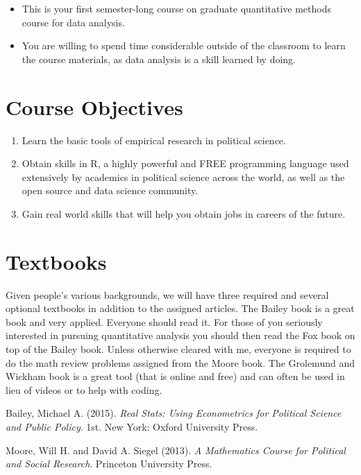 \documentclass[11pt,]{article}
\begin{document}
\begin{itemize}
\item
  This is your first semester-long course on graduate quantitative
  methods course for data analysis.
\item
  You are willing to spend time considerable outside of the classroom to
  learn the course materials, as data analysis is a skill learned by
  doing.
\end{itemize}

\section{Course Objectives}\label{course-objectives}

\begin{enumerate}
\def\labelenumi{\arabic{enumi}.}
\item
  Learn the basic tools of empirical research in political science.
\item
  Obtain skills in R, a highly powerful and FREE programming language
  used extensively by academics in political science across the world,
  as well as the open source and data science community.
\item
  Gain real world skills that will help you obtain jobs in careers of
  the future.
\end{enumerate}

\section{Textbooks}\label{textbooks}

Given people's various backgrounds, we will have three required and
several optional textbooks in addition to the assigned articles. The
Bailey book is a great book and very applied. Everyone should read it.
For those of you seriously interested in pursuing quantitative analysis
you should then read the Fox book on top of the Bailey book. Unless
otherwise cleared with me, everyone is required to do the math review
problems assigned from the Moore book. The Grolemund and Wickham book is
a great tool (that is online and free) and can often be used in lieu of
videos or to help with coding.

 Bailey, Michael A. (2015).
\emph{Real Stats: Using Econometrics for Political
Science and Public Policy}. 1st. New York: Oxford University Press.

 Moore, Will H. and David A. Siegel (2013).
\emph{A Mathematics Course for Political and Social Research}. Princeton
University Press.
\end{document}
